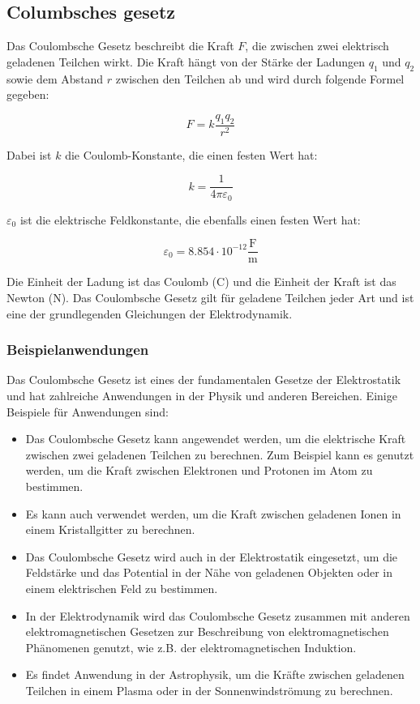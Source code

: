 \documentclass{article}
\begin{document}
\subsection{Columbsches gesetz}

Das Coulombsche Gesetz beschreibt die Kraft $F$, die zwischen zwei elektrisch
geladenen Teilchen wirkt. Die Kraft hängt von der Stärke der Ladungen $q_1$ und
$q_2$ sowie dem Abstand $r$ zwischen den Teilchen ab und wird durch folgende
Formel gegeben:

\begin{equation}
F = k \frac{q_1 q_2}{r^2}
\end{equation}

Dabei ist $k$ die Coulomb-Konstante, die einen festen Wert hat:

\begin{equation}
k = \frac{1}{4 \pi \varepsilon_0}
\end{equation}

$\varepsilon_0$ ist die elektrische Feldkonstante, die ebenfalls einen festen Wert hat:

\begin{equation}
\varepsilon_0 = 8.854 \cdot 10^{-12} \mathrm{\frac{F}{m}}
\end{equation}

Die Einheit der Ladung ist das Coulomb ($\mathrm{C}$) und die Einheit der Kraft
ist das Newton ($\mathrm{N}$). Das Coulombsche Gesetz gilt für geladene Teilchen
jeder Art und ist eine der grundlegenden Gleichungen der Elektrodynamik.

\subsubsection{Beispielanwendungen}

Das Coulombsche Gesetz ist eines der fundamentalen Gesetze der Elektrostatik und
hat zahlreiche Anwendungen in der Physik und anderen Bereichen. Einige Beispiele
für Anwendungen sind:

\begin{itemize}
\item Das Coulombsche Gesetz kann angewendet werden, um die elektrische Kraft
    zwischen zwei geladenen Teilchen zu berechnen. Zum Beispiel kann es genutzt
    werden, um die Kraft zwischen Elektronen und Protonen im Atom zu bestimmen.
\item Es kann auch verwendet werden, um die Kraft zwischen geladenen Ionen in
    einem Kristallgitter zu berechnen.
\item Das Coulombsche Gesetz wird auch in der Elektrostatik eingesetzt, um die
    Feldstärke und das Potential in der Nähe von geladenen Objekten oder in
    einem elektrischen Feld zu bestimmen.
\item In der Elektrodynamik wird das Coulombsche Gesetz zusammen mit anderen
    elektromagnetischen Gesetzen zur Beschreibung von elektromagnetischen
    Phänomenen genutzt, wie z.B. der elektromagnetischen Induktion.
\item Es findet Anwendung in der Astrophysik, um die Kräfte zwischen geladenen
    Teilchen in einem Plasma oder in der Sonnenwindströmung zu berechnen.
\end{itemize}
\end{document}
